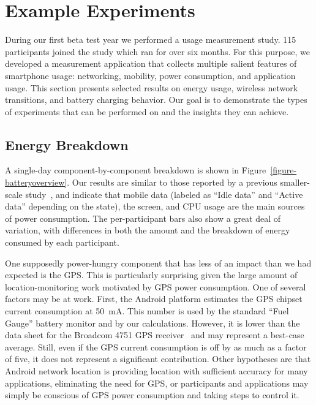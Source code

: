 \section{Example Experiments}
\label{sec-experiments}

During our first beta test year we performed a usage measurement study. 115
participants joined the study which ran for over six months. For this
purpose, we developed a measurement application that collects multiple
salient features of smartphone usage: networking, mobility, power
consumption, and application usage. This section presents selected results on
energy usage, wireless network transitions, and battery charging behavior.
Our goal is to demonstrate the types of experiments that can be performed on
\PhoneLab{} and the insights they can achieve.

\subsection{Energy Breakdown}
\label{subsec-energybreakdown}

A single-day component-by-component breakdown is shown in
Figure~\ref{figure-batteryoverview}. Our results are similar to those reported
by a previous smaller-scale study~\cite{shye:micro:2009}, and indicate that
mobile data (labeled as ``Idle data'' and ``Active data'' depending on the
state), the screen, and CPU usage are the main sources of power consumption. The
per-participant bars also show a great deal of variation, with differences in
both the amount and the breakdown of energy consumed by each participant.

One supposedly power-hungry component that has less of an impact than we had
expected is the GPS. This is particularly surprising given the large amount
of location-monitoring work motivated by GPS power consumption. One of
several factors may be at work. First, the Android platform estimates the GPS
chipset current consumption at 50~mA. This number is used by the standard
``Fuel Gauge'' battery monitor and by our calculations. However, it is lower
than the data sheet for the Broadcom 4751 GPS receiver~\cite{bcm4751} and may
represent a best-case average. Still, even if the GPS current consumption is
off by as much as a factor of five, it does not represent a significant
contribution. Other hypotheses are that Android network location is providing
location with sufficient accuracy for many applications, eliminating the need
for GPS, or participants and applications may simply be conscious of GPS
power consumption and taking steps to control it.

